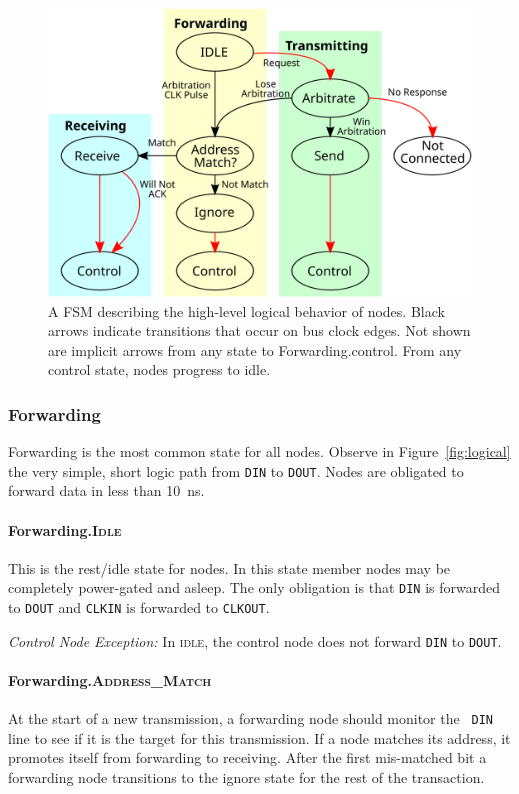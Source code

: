 \begin{figure}[h]
  \includegraphics[width=\linewidth]{img/fsm_diagram}
  \caption{A FSM describing the high-level logical behavior of \bus nodes.
    Black arrows indicate transitions that occur on bus clock edges. Not shown
    are implicit arrows from any state to Forwarding.{\sc control}. From any
    {\sc control} state, nodes progress to {\sc idle}.
    }
\end{figure}

\subsubsection{Forwarding}
Forwarding is the most common state for all \bus nodes.  Observe in
Figure~\ref{fig:logical} the very simple, short logic path from {\tt DIN} to
{\tt DOUT}. Nodes are obligated to forward data in less than 10~ns.

\paragraph{Forwarding.\textsc{Idle}}
This is the rest/idle state for \bus nodes. In this state member nodes may be
completely power-gated and asleep. The only obligation is that {\tt DIN} is
forwarded to {\tt DOUT} and {\tt CLKIN} is forwarded to {\tt CLKOUT}.

\medskip
\noindent
{\em Control Node Exception:} In \textsc{idle}, the control node does not
forward {\tt DIN} to {\tt DOUT}.

\paragraph{Forwarding.\textsc{Address\_Match}}
At the start of a new transmission, a forwarding node should monitor the {\tt
DIN} line to see if it is the target for this transmission. If a node matches
its address, it promotes itself from forwarding to receiving. After the first
mis-matched bit a forwarding node transitions to the {\sc ignore} state for
the rest of the transaction.


